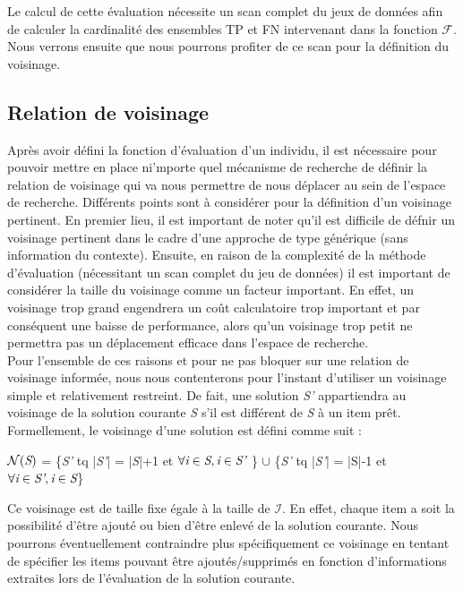 \documentclass[a4paper,10pt]{report}
\begin{document}
Le calcul de cette évaluation nécessite un scan complet du jeux de données afin de calculer la cardinalité des ensembles TP et FN intervenant dans la fonction $\mathcal{F}$. Nous verrons ensuite que nous pourrons profiter de ce scan pour la définition du voisinage.

\subsection{Relation de voisinage}

	Après avoir défini la fonction d'évaluation d'un individu, il est nécessaire pour pouvoir mettre en place ni'mporte quel mécanisme de recherche de définir la relation de voisinage qui va nous permettre de nous déplacer au sein de l'espace de recherche. Différents points sont à considérer pour la définition d'un voisinage pertinent. En premier lieu, il est important de noter qu'il est difficile de défnir un voisinage pertinent dans le cadre d'une approche de type générique (sans information du contexte). Ensuite, en raison de la complexité de la méthode d'évaluation (nécessitant un scan complet du jeu de données) il est important de considérer la taille du voisinage comme un facteur important. En effet, un voisinage trop grand engendrera un coût calculatoire trop important et par conséquent une baisse de performance, alors qu'un voisinage trop petit ne permettra pas un déplacement efficace dans l'espace de recherche.\\
	
	Pour l'ensemble de ces raisons et pour ne pas bloquer sur une relation de voisinage informée, nous nous contenterons pour l'instant d'utiliser un voisinage simple et relativement restreint. De fait, une solution \emph{S'} appartiendra au voisinage de la solution courante \emph{S} s'il est différent de \emph{S} à un item prêt. Formellement, le voisinage d'une solution est défini comme suit : \\

\begin{center}
	$\mathcal{N}(\emph{S})$ = \{\emph{S'} tq |\emph{S'}| = |\emph{S}|+1 et $\forall \emph{i} \in \emph{S}, \emph{i} \in \emph{S'} $ \} $\cup$ \{\emph{S'} tq |\emph{S'}| = |S|-1 et $ \forall \emph{i} \in \emph{S'}, \emph{i} \in \emph{S}$\}   \\
\end{center}	

Ce voisinage est de taille fixe égale à la taille de $\mathcal{I}$. En effet, chaque item a soit la possibilité d'être ajouté ou bien d'être enlevé de la solution courante. Nous pourrons éventuellement contraindre plus spécifiquement ce voisinage en tentant de spécifier les items pouvant être ajoutés/supprimés en fonction d'informations extraites lors de l'évaluation de la solution courante.
\end{document}
